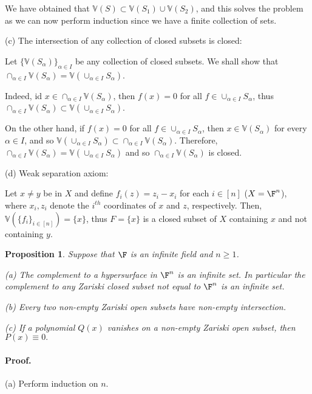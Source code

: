 \documentclass[11pt]{article}
\newtheorem{prop}{Proposition}
\begin{document}
We have obtained that $\mathbb{V}(S) \subset \mathbb{V}(S_1) \cup \mathbb{V}(S_2)$, and this solves the problem as we can now perform induction since we have a finite collection of sets. 

(c) The intersection of any collection of closed subsets is closed: 

Let $\{ \mathbb{V}(S_\alpha)\}_{\alpha \in I}$ be any collection of closed subsets. We shall show that $\cap_{\alpha \in I}\mathbb{V}(S_\alpha)=\mathbb{V}(\cup_{\alpha \in I}S_{\alpha})$. 

Indeed, id $x \in \cap_{\alpha \in I}\mathbb{V}(S_\alpha)$, then $f(x)=0$ for all $f \in \cup_{\alpha \in I}S_{\alpha}$, thus $\cap_{\alpha \in I}\mathbb{V}(S_\alpha) \subset \mathbb{V}(\cup_{\alpha \in I}S_{\alpha})$.

On the other hand, if $f(x)=0$ for all $f \in \cup_{\alpha \in I}S_{\alpha}$, then $x \in \mathbb{V}(S_{\alpha})$ for every $\alpha \in I$, and so
$ \mathbb{V}(\cup_{\alpha \in I}S_{\alpha}) \subset \cap_{\alpha \in I}\mathbb{V}(S_\alpha)$. Therefore,  $\cap_{\alpha \in I}\mathbb{V}(S_\alpha)=\mathbb{V}(\cup_{\alpha \in I}S_{\alpha})$ and so $\cap_{\alpha \in I}\mathbb{V}(S_\alpha)$ is closed.

(d) Weak separation axiom:

Let $x \neq y$ be in $X$ and define $f_i(z)=z_i-x_i$ for each $i \in [n]$ ($X={\F}^n$), where $x_i, z_i$ denote the $i^{th}$ coordinates of $x$ and $z$, respectively. Then, $\mathbb{V}(\{f_i\}_{i \in [n]})=\{x\}$, thus $F=\{x\}$ is a closed subset of $X$ containing $x$ and not containing $y$. 


\begin{prop}
Suppose that $\F$ is an infinite field and $n \geq 1$. 

(a) The complement to a hypersurface in $\F^n$ is an infinite set. In particular the complement to any Zariski closed subset not equal to $\F^n$ is an infinite set. 

(b) Every two non-empty Zariski open subsets have non-empty intersection. 

(c) If a polynomial $Q(x)$ vanishes on a non-empty Zariski open subset, then $P(x) \equiv 0.$

\end{prop}

\paragraph{Proof.} 


(a) Perform induction on $n$.
\end{document}
